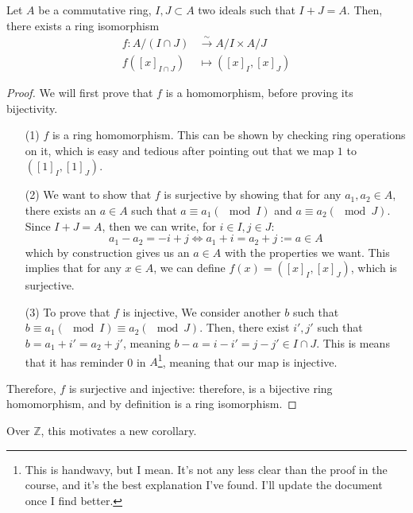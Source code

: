 \begin{theorem}
  Let $A$ be a commutative ring, $I, J \subset A$ two ideals such that $I + J = A$. Then, there exists a ring isomorphism\footnotemark 
  \begin{align*}
    f: A/(I \cap J)      &\stackrel{\sim}{\to} A/I \times A/J \\
       f([x]_{I \cap J}) &\mapsto ([x]_I, [x]_J)
  \end{align*}
\end{theorem}
\begin{proof}
  We will first prove that $f$ is a homomorphism, before proving its bijectivity. 
  \begin{enumerate}
    \item[\small(1)] $f$ is a ring homomorphism. This can be shown by checking ring operations on it, which is easy and tedious after pointing out that we map $1$ to $([1]_I, [1]_J)$. 
    \item[\small(2)] We want to show that $f$ is surjective by showing that for any $a_1, a_2 \in A$, there exists an $a \in A$ such that $a \equiv a_1 (\mod I)$ and $a \equiv a_2 (\mod J)$. Since $I + J = A$, then we can write, for $i \in I, j \in J$: 
    \[
      a_1 - a_2 = -i + j \Leftrightarrow a_1 + i = a_2 + j := a \in A
    \]
    which by construction gives us an $a \in A$ with the properties we want. This implies that for any $x \in A$, we can define $f(x) = ([x]_I, [x]_J)$, which is surjective. 
    \item[\small(3)] To prove that $f$ is injective, We consider another $b$ such that $b \equiv a_1 (\mod I) \equiv a_2 (\mod J)$. Then, there exist $i', j'$ such that $b = a_1 + i' = a_2 + j'$, meaning $b - a = i - i' = j - j' \in I \cap J$. This is means that it has reminder 0 in $A$\footnote{This is handwavy, but I mean. It's not any less clear than the proof in the course, and it's the best explanation I've found. I'll update the document once I find better.}, meaning that our map is injective. 
  \end{enumerate}
  Therefore, $f$ is surjective and injective: therefore, is a bijective ring homomorphism, and by definition is a ring isomorphism.
\end{proof}

Over $\mathbb{Z}$, this motivates a new corollary. 


